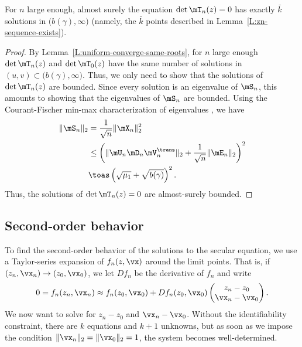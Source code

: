 \begin{lemma}\label{L:detT-solution-upper-bound}
    For $n$ large enough, almost surely
    the equation $\det \mT_n(z) = 0$ has exactly 
    $\bar k$ solutions in  $\big( b(\gamma), \infty \big)$
    (namely, the $\bar k$  points described in 
    Lemma~\ref{L:zn-sequence-exists}).
\end{lemma}
\begin{proof}
    By Lemma~\ref{L:uniform-converge-same-roots}, for $n$ large enough
    $\det \mT_n(z)$ and $\det \mT_0(z)$ have the same number of solutions in 
    $(u,v) \subset \big( b(\gamma), \infty \big)$.  Thus, we only need to
    show that the solutions of $\det \mT_n(z)$ are bounded.  Since every
    solution is an eigenvalue of $\mS_n$, this amounts to showing that the
    eigenvalues of $\mS_n$ are bounded.  Using the Courant-Fischer 
    min-max characterization of eigenvalues \cite{golub1996mc}, we have
    \begin{align*}
        \| \mS_n \|_2
            &= \frac{1}{\sqrt{n}} \| \mX_n \|_2^2 \\
            &\leq 
                \left(
                    \| \mU_n \mD_n \mV_n^\trans \|_2
                    +
                    \frac{1}{\sqrt{n}}
                    \| \mE_n \|_2
                \right)^2 \\
            &\toas
                \left( \sqrt{\mu_1} + \sqrt{b(\gamma)} \right)^2.
    \end{align*}
    Thus, the solutions of $\det \mT_n(z) = 0$ are almost-surely bounded.
\end{proof}


\subsection{Second-order behavior}

To find the second-order behavior of the solutions to the secular equation, we use a Taylor-series expansion of $f_n(z,\vx)$ around the limit points.  That is, if $(z_n, \vx_n) \to (z_0, \vx_0)$, we let $D f_n$ be the derivative of $f_n$ and write
\[
    0
    =
    f_n (z_n, \vx_n)
        \approx
        f_n( z_0, \vx_0 )
        + 
        D f_n(z_0, \vx_0)
        \left(
        \begin{matrix}
            z_n   - z_0 \\
            \vx_n - \vx_0
        \end{matrix}
        \right).
\]
We now want to solve for $z_n - z_0$ and $\vx_n - \vx_0$.  Without the identifiability constraint, there are $k$ equations and $k+1$ unknowns, but as soon as we impose the condition $\| \vx_n \|_2 = \| \vx_0 \|_2 = 1$, the
system becomes well-determined.


